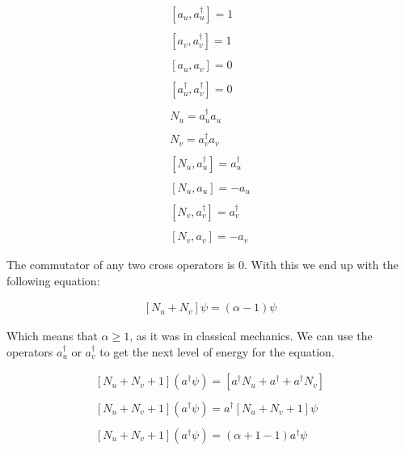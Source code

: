 \begin{equation}
  \begin{array}{c}
    \left[a_u,a_u^{\dagger}\right] = 1
    \\

    \\
    \left[a_v,a_v^{\dagger}\right] = 1
    \\

    \\
    \left[a_u,a_v\right] = 0
    \\

    \\
    \left[a_u^{\dagger},a_v^{\dagger}\right] = 0
    \\

    \\
    N_u = a_u^{\dagger}a_u
    \\

    \\
    N_v = a_v^{\dagger}a_v
    \\

    \\
    \left[N_u,a_u^{\dagger}\right] = a_u^{\dagger}
    \\

    \\
    \left[N_u,a_u\right] = -a_u
    \\

    \\
    \left[N_v,a_v^{\dagger}\right] = a_v^{\dagger}
    \\

    \\
    \left[N_v,a_v\right] = -a_v
  \end{array}
\end{equation}

The commutator of any two cross operators is 0. With this we end up with the following equation:

\begin{equation}
  \begin{array}{c}
    \left[N_u+N_v\right] \psi = (\alpha-1) \psi
  \end{array}
\end{equation}

Which means that $\alpha \geq 1$, as it was in classical mechanics. We can use the operators $a_u^{\dagger}$ or $a_v^{\dagger}$ to get the next level of energy for the equation.

\begin{equation}
  \begin{array}{c}
      \left[N_u+N_v+1\right] (a^{\dagger}\psi) = \left[a^{\dagger}N_u + a^{\dagger} + a^{\dagger}N_v \right]
      \\

      \\
      \left[N_u+N_v+1\right] (a^{\dagger}\psi) = a^{\dagger}[N_u+N_v+1]\psi
      \\

      \\
      \left[N_u+N_v+1\right] (a^{\dagger}\psi) = (\alpha+1-1)a^{\dagger}\psi
  \end{array}
\end{equation}

